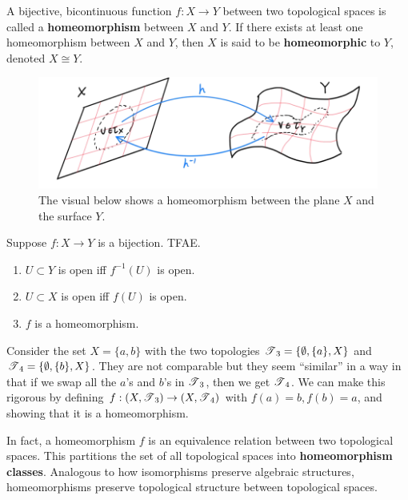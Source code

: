   \begin{definition}[Homeomorphism]
    A bijective, bicontinuous function $f: X \longrightarrow Y$ between two topological spaces is called a \textbf{homeomorphism} between $X$ and $Y$. If there exists at least one homeomorphism between $X$ and $Y$, then $X$ is said to be \textbf{homeomorphic} to $Y$, denoted $X \cong Y$. 

    \begin{figure}[H]
      \centering 
      \includegraphics[scale=0.4]{img/Homeomorphism_of_Plane.png}
      \caption{The visual below shows a homeomorphism between the plane $X$ and the surface $Y$.}
      \label{fig:homeomorphism_plane}
    \end{figure}
  \end{definition}

  \begin{theorem}
    Suppose $f: X \rightarrow Y$ is a bijection. TFAE. 
    \begin{enumerate}
      \item $U \subset Y$ is open iff $f^{-1} (U)$ is open. 
      \item $U \subset X$ is open iff $f(U)$ is open. 
      \item $f$ is a homeomorphism. 
    \end{enumerate}
  \end{theorem} 

  \begin{example}
    Consider the set $X = \{a, b\}$ with the two topologies $\T_3 = \{\emptyset, \{a\}, X\}$ and $\T_4 = \{\emptyset, \{b\}, X\}$. They are not comparable but they seem ``similar'' in a way in that if we swap all the $a$'s and $b$'s in $\T_3$, then we get $\T_4$. We can make this rigorous by defining $f: (X, \T_3) \rightarrow (X, \T_4)$ with $f(a) = b, f(b) = a$, and showing that it is a homeomorphism. 
  \end{example}

  In fact, a homeomorphism $f$ is an equivalence relation between two topological spaces. This partitions the set of all topological spaces into \textbf{homeomorphism classes}. Analogous to how isomorphisms preserve algebraic structures, homeomorphisms preserve topological structure between topological spaces. 

